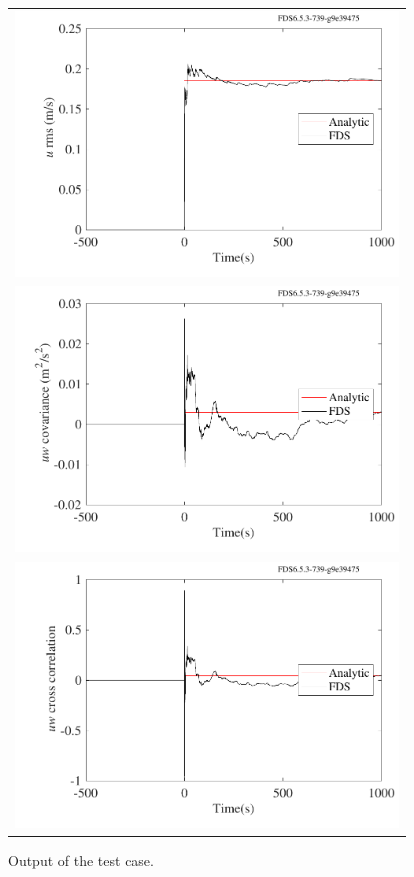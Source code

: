 \documentclass[11pt]{book}
\begin{document}
\begin{figure}[h!]
\begin{center}
\begin{tabular}{l}
\includegraphics[width=4in]{SCRIPT_FIGURES/rms_cov_corr_rms}\\
\includegraphics[width=4in]{SCRIPT_FIGURES/rms_cov_corr_cov} \\
\includegraphics[width=4in]{SCRIPT_FIGURES/rms_cov_corr_corr}
\end{tabular}
\end{center}
\caption[Sample case ]{Output of the  test case.}
\label{rms_cov_corr_plots}
\end{figure}
\end{document}
